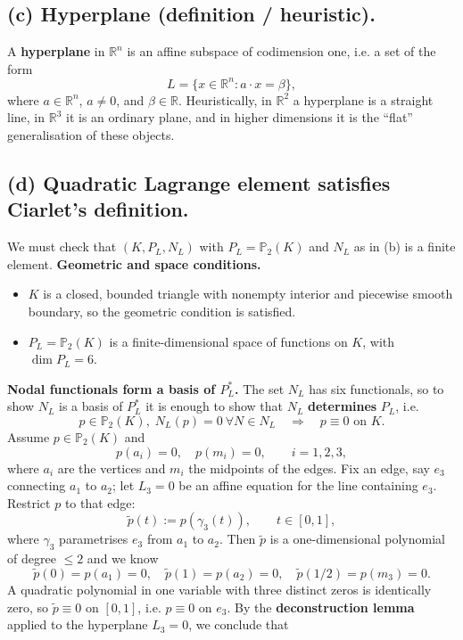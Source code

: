 \subsection*{(c) Hyperplane (definition / heuristic).}
A \textbf{hyperplane} in $\mathbb{R}^n$ is an affine subspace of codimension one, i.e.
a set of the form
\[
    L = \{ x \in \mathbb{R}^n : a \cdot x = \beta\},
\]
where $a \in \mathbb{R}^n$, $a \neq 0$, and $\beta \in \mathbb{R}$.
Heuristically, in $\mathbb{R}^2$ a hyperplane is a straight line, in $\mathbb{R}^3$
it is an ordinary plane, and in higher dimensions it is the “flat” generalisation
of these objects.

\subsection*{(d) Quadratic Lagrange element satisfies Ciarlet's definition.}
We must check that $(K,P_L,N_L)$ with
$P_L = \mathbb{P}_2(K)$ and $N_L$ as in (b) is a finite element.
\textbf{Geometric and space conditions.}
\begin{itemize}
    \item $K$ is a closed, bounded triangle with nonempty interior and piecewise smooth boundary,
          so the geometric condition is satisfied.
    \item $P_L = \mathbb{P}_2(K)$ is a finite-dimensional space of functions on $K$, with
          $\dim P_L = 6$.
\end{itemize}
\textbf{Nodal functionals form a basis of $P_L^\ast$.}
The set $N_L$ has six functionals, so to show $N_L$ is a basis of $P_L^\ast$ it is enough to show
that $N_L$ \textbf{determines} $P_L$, i.e.
\[
    p \in \mathbb{P}_2(K),\; N_L(p) = 0\ \forall N \in N_L
    \quad \Longrightarrow \quad p \equiv 0 \text{ on } K.
\]
Assume $p \in \mathbb{P}_2(K)$ and
\[
    p(a_i) = 0,\quad p(m_i) = 0, \qquad i=1,2,3,
\]
where $a_i$ are the vertices and $m_i$ the midpoints of the edges.
Fix an edge, say $e_3$ connecting $a_1$ to $a_2$; let $L_3=0$ be an affine equation
for the line containing $e_3$.
Restrict $p$ to that edge:
\[
    \tilde p(t) := p(\gamma_3(t)), \qquad t \in [0,1],
\]
where $\gamma_3$ parametrises $e_3$ from $a_1$ to $a_2$.
Then $\tilde p$ is a one-dimensional polynomial of degree $\le 2$
and we know
\[
    \tilde p(0) = p(a_1) = 0,\quad
    \tilde p(1) = p(a_2) = 0,\quad
    \tilde p(1/2) = p(m_3) = 0.
\]
A quadratic polynomial in one variable with three distinct zeros is identically zero,
so $\tilde p \equiv 0$ on $[0,1]$, i.e. $p \equiv 0$ on $e_3$.
By the \textbf{deconstruction lemma} applied to the hyperplane $L_3=0$, we conclude that
